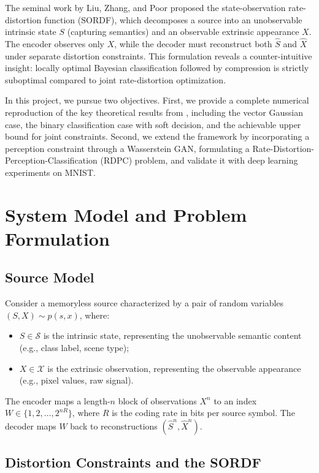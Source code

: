 \documentclass[conference]{IEEEtran}
\begin{document}
The seminal work by Liu, Zhang, and Poor \cite{liu2021rate} proposed the state-observation rate-distortion function (SORDF), which decomposes a source into an unobservable intrinsic state $S$ (capturing semantics) and an observable extrinsic appearance $X$. The encoder observes only $X$, while the decoder must reconstruct both $\hat{S}$ and $\hat{X}$ under separate distortion constraints. This formulation reveals a counter-intuitive insight: locally optimal Bayesian classification followed by compression is strictly suboptimal compared to joint rate-distortion optimization.

In this project, we pursue two objectives. First, we provide a complete numerical reproduction of the key theoretical results from \cite{liu2021rate}, including the vector Gaussian case, the binary classification case with soft decision, and the achievable upper bound for joint constraints. Second, we extend the framework by incorporating a perception constraint through a Wasserstein GAN, formulating a Rate-Distortion-Perception-Classification (RDPC) problem, and validate it with deep learning experiments on MNIST.

\section{System Model and Problem Formulation}

\subsection{Source Model}

Consider a memoryless source characterized by a pair of random variables $(S, X) \sim p(s, x)$, where:
\begin{itemize}
    \item $S \in \mathcal{S}$ is the intrinsic state, representing the unobservable semantic content (e.g., class label, scene type);
    \item $X \in \mathcal{X}$ is the extrinsic observation, representing the observable appearance (e.g., pixel values, raw signal).
\end{itemize}

The encoder maps a length-$n$ block of observations $X^n$ to an index $W \in \{1, 2, \dots, 2^{nR}\}$, where $R$ is the coding rate in bits per source symbol. The decoder maps $W$ back to reconstructions $(\hat{S}^n, \hat{X}^n)$.

\subsection{Distortion Constraints and the SORDF}
\end{document}
